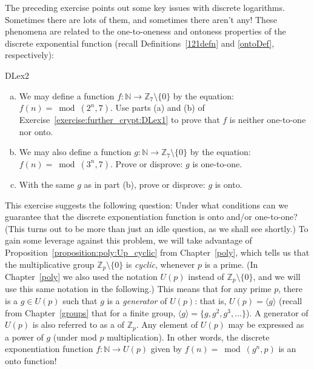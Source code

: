 The preceding exercise points out some key issues with discrete logarithms. Sometimes there are lots of them, and sometimes there aren't any! These phenomena are related to the one-to-oneness and ontoness properties of  the discrete exponential function (recall Definitions~\ref{121defn} and \ref{ontoDef}, respectively):

\begin{exercise}{DLex2}
\begin{enumerate}[(a)]
\item
We may define a function $f: \mathbb{N} \rightarrow \mathbb{Z}_7 \setminus \{0\}$ by the equation: $f(n) = \bmod(2^n,7)$. 
Use parts (a) and (b) of Exercise~\ref{exercise:further_crypt:DLex1} to prove that $f$ is neither one-to-one nor onto.
\item
We may also define a function $g: \mathbb{N} \rightarrow \mathbb{Z}_7 \setminus \{0\}$ by the equation: $f(n) = \bmod(3^n,7)$. 
Prove or disprove: $g$ is one-to-one.
\item
With the same $g$ as in part (b), prove or disprove: $g$ is onto.
\end{enumerate}
\end{exercise}

This exercise suggests the following question:  Under what conditions can we guarantee that the discrete exponentiation function is onto and/or one-to-one? (This turns out to be more than just an idle question, as we shall see shortly.)  To gain some leverage against this problem, we will take advantage of   Proposition~\ref{proposition:poly:Up_cyclic} from Chapter~\ref{poly}, which tells us that the multiplicative group $\mathbb{Z}_p\setminus \{0\}$ is \emph{cyclic}, whenever $p$ is a prime. (In Chapter~\ref{poly} we also used the notation $U(p)$ instead of $\mathbb{Z}_p\setminus \{0\}$, and we will use this same notation in the following.) This means that for any prime $p$, there is a $g \in U(p)$  such that $g$ is a \emph{generator} of  $U(p)$: that is, $U(p) = \langle g \rangle$ (recall from Chapter~\ref{groups} that for a finite group, $\langle g \rangle = \{g, g^2, g^3, \ldots \}$). A generator of $U(p)$ is also referred to as a  of $\mathbb{Z}_p$. Any element of $U(p)$ may be expressed as a power of $g$ (under mod $p$ multiplication).  In other words, the discrete exponentiation function $f: \mathbb{N} \rightarrow U(p)$ given by $f(n) = \bmod(g^n,p)$ is an onto function!  

